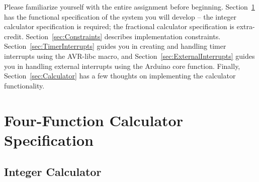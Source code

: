 Please familiarize yourself with the entire assignment before beginning.
Section~\ref{sec:FunctionalSpecification} has the functional specification of
the system you will develop -- the integer calculator specification is
required; the fractional calculator specification is extra-credit.
Section~\ref{sec:Constraints} describes implementation constraints.
Section~\ref{sec:TimerInterrupts} guides you in creating and handling timer
interrupts using the AVR-libc  macro, and
Section~\ref{sec:ExternalInterrupts} guides you in handling external interrupts
using the Arduino core  function. Finally,
Section~\ref{sec:Calculator} has a few thoughts on implementing the calculator
functionality.

\section{Four-Function Calculator Specification} \label{sec:FunctionalSpecification}

\subsection*{Integer Calculator}

